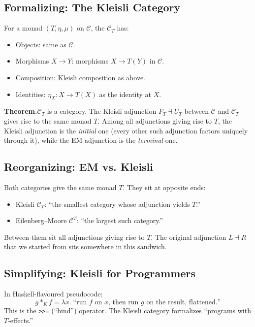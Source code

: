 \subsection{Formalizing: The Kleisli Category}

For a monad $(T, \eta, \mu)$ on $\mathcal{C}$, the 
$\mathcal{C}_T$ has:
\begin{itemize}
  \item Objects: same as $\mathcal{C}$.
  \item Morphisms $X \to Y$: morphisms $X \to T(Y)$ in $\mathcal{C}$.
  \item Composition: Kleisli composition as above.
  \item Identities: $\eta_X : X \to T(X)$ as the identity at $X$.
\end{itemize}

\textbf{Theorem.}\quad $\mathcal{C}_T$ is a category. The Kleisli
adjunction $F_T \dashv U_T$ between $\mathcal{C}$ and $\mathcal{C}_T$
gives rise to the same monad $T$. Among all adjunctions giving rise to
$T$, the Kleisli adjunction is the \emph{initial} one (every other such
adjunction factors uniquely through it), while the EM adjunction is the
\emph{terminal} one.

\subsection{Reorganizing: EM vs. Kleisli}

Both categories give the same monad $T$. They sit at opposite ends:
\begin{itemize}
  \item Kleisli $\mathcal{C}_T$: ``the smallest category whose adjunction
        yields $T$.''
  \item Eilenberg--Moore $\mathcal{C}^T$: ``the largest such category.''
\end{itemize}
Between them sit all adjunctions giving rise to $T$. The original
adjunction $L \dashv R$ that we started from sits somewhere in this
sandwich.

\subsection{Simplifying: Kleisli for Programmers}

In Haskell-flavoured pseudocode:
\begin{equation*}
  g *_K f = \lambda x.\; \text{``run $f$ on $x$, then run $g$ on the result, flattened.''}
\end{equation*}
This is the \texttt{>>=} (``bind'') operator. The Kleisli category
formalizes ``programs with $T$-effects.''

